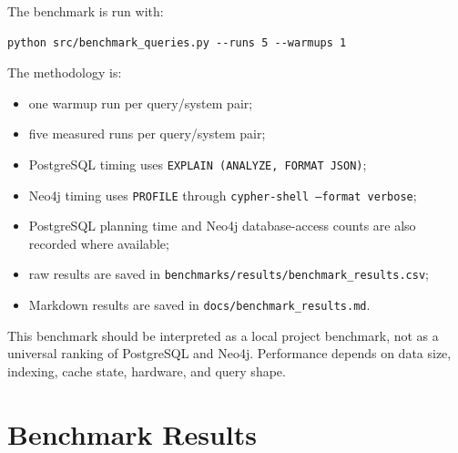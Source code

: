 \documentclass[11pt]{article}
\begin{document}
The benchmark is run with:

\begin{verbatim}
python src/benchmark_queries.py --runs 5 --warmups 1
\end{verbatim}

The methodology is:

\begin{itemize}
    \item one warmup run per query/system pair;
    \item five measured runs per query/system pair;
    \item PostgreSQL timing uses \texttt{EXPLAIN (ANALYZE, FORMAT JSON)};
    \item Neo4j timing uses \texttt{PROFILE} through \texttt{cypher-shell --format verbose};
    \item PostgreSQL planning time and Neo4j database-access counts are also recorded where available;
    \item raw results are saved in \texttt{benchmarks/results/benchmark\_results.csv};
    \item Markdown results are saved in \texttt{docs/benchmark\_results.md}.
\end{itemize}

This benchmark should be interpreted as a local project benchmark, not as a universal ranking of PostgreSQL and Neo4j.
Performance depends on data size, indexing, cache state, hardware, and query shape.

\section{Benchmark Results}
\end{document}
